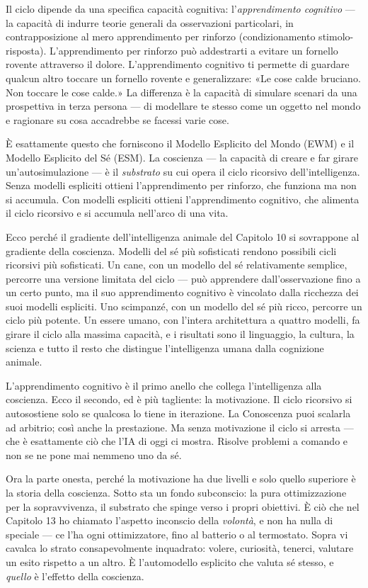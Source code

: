 \documentclass[11pt, twoside, openright]{book}
\begin{document}
Il ciclo dipende da una specifica capacità cognitiva: l'\textit{apprendimento cognitivo} --- la capacità di indurre teorie generali da osservazioni particolari, in contrapposizione al mero apprendimento per rinforzo (condizionamento stimolo-risposta). L'apprendimento per rinforzo può addestrarti a evitare un fornello rovente attraverso il dolore. L'apprendimento cognitivo ti permette di guardare qualcun altro toccare un fornello rovente e generalizzare: «Le cose calde bruciano. Non toccare le cose calde.» La differenza è la capacità di simulare scenari da una prospettiva in terza persona --- di modellare te stesso come un oggetto nel mondo e ragionare su cosa accadrebbe se facessi varie cose.

È esattamente questo che forniscono il Modello Esplicito del Mondo (EWM) e il Modello Esplicito del Sé (ESM). La coscienza --- la capacità di creare e far girare un'autosimulazione --- è il \textit{substrato} su cui opera il ciclo ricorsivo dell'intelligenza. Senza modelli espliciti ottieni l'apprendimento per rinforzo, che funziona ma non si accumula. Con modelli espliciti ottieni l'apprendimento cognitivo, che alimenta il ciclo ricorsivo e si accumula nell'arco di una vita.

Ecco perché il gradiente dell'intelligenza animale del Capitolo 10 si sovrappone al gradiente della coscienza. Modelli del sé più sofisticati rendono possibili cicli ricorsivi più sofisticati. Un cane, con un modello del sé relativamente semplice, percorre una versione limitata del ciclo --- può apprendere dall'osservazione fino a un certo punto, ma il suo apprendimento cognitivo è vincolato dalla ricchezza dei suoi modelli espliciti. Uno scimpanzé, con un modello del sé più ricco, percorre un ciclo più potente. Un essere umano, con l'intera architettura a quattro modelli, fa girare il ciclo alla massima capacità, e i risultati sono il linguaggio, la cultura, la scienza e tutto il resto che distingue l'intelligenza umana dalla cognizione animale.

L'apprendimento cognitivo è il primo anello che collega l'intelligenza alla coscienza. Ecco il secondo, ed è più tagliente: la motivazione. Il ciclo ricorsivo si autosostiene solo se qualcosa lo tiene in iterazione. La Conoscenza puoi scalarla ad arbitrio; così anche la prestazione. Ma senza motivazione il ciclo si arresta --- che è esattamente ciò che l'IA di oggi ci mostra. Risolve problemi a comando e non se ne pone mai nemmeno uno da sé.

Ora la parte onesta, perché la motivazione ha due livelli e solo quello superiore è la storia della coscienza. Sotto sta un fondo subconscio: la pura ottimizzazione per la sopravvivenza, il substrato che spinge verso i propri obiettivi. È ciò che nel Capitolo 13 ho chiamato l'aspetto inconscio della \textit{volontà}, e non ha nulla di speciale --- ce l'ha ogni ottimizzatore, fino al batterio o al termostato. Sopra vi cavalca lo strato consapevolmente inquadrato: volere, curiosità, tenerci, valutare un esito rispetto a un altro. È l'automodello esplicito che valuta sé stesso, e \textit{quello} è l'effetto della coscienza.
\end{document}

